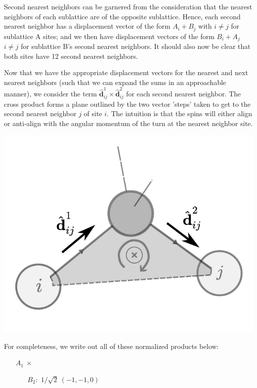 \documentclass[10pt,a4paper]{article}
\begin{document}
\begin{multicols}{2}
Second nearest neighbors can be garnered from the consideration that the nearest neighbors of each sublattice are of the opposite sublattice. Hence, each second nearest neighbor has a displacement vector of the form $A_i+B_j$ with $i\neq j$ for sublattice A sites; and we then have displacement vectors of the form $B_i+A_j$ $i\neq j$ for sublattice B's second nearest neighbors. It should also now be clear that both  sites have 12 second nearest neighbors.

Now that we have the appropriate displacement vectors for the nearest and next nearest neighbors (such that we can expand the sums in an approachable manner), we consider the 
term $\mathbf{\hat{d}}^1_{ij}\times \mathbf{\hat{d}}^2_{ij}$ for each second nearest neighbor. The cross product forms a plane outlined by the two vector 'steps' taken to get to the second nearest neighbor $j$ of site $i$. The intuition is that the spins will either align or anti-align with the angular momentum of the turn at the nearest neighbor site.
\begin{center}
\includegraphics[scale=0.5]{diamond_nnn.pdf}
\end{center}
For completeness, we write out all of these normalized products below:
\begin{center}
\begin{minipage}[c]{0.6\linewidth}
\begin{itemize}
\item[$A_1 \ \times$] \begin{itemize}
\item[$B_2:$] $1/\sqrt{2}\ (-1,-1,0)$

\end{itemize}
\end{itemize}
\end{minipage}
\end{center}
\end{multicols}
\end{document}
